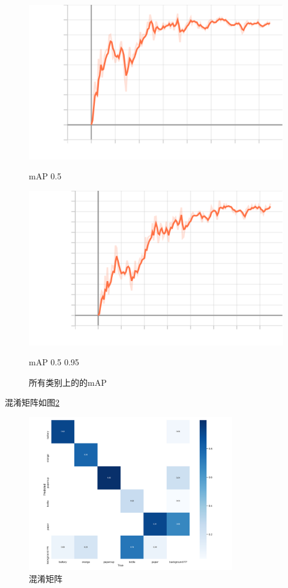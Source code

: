 \documentclass{article}
\begin{document}
\begin{figure}[H]
    \begin{minipage}[H]{0.5\linewidth}
        \centering
        \includegraphics[width=\textwidth]{figures/metrics_mAP_0.5.png}
        \caption{mAP 0.5}
    \end{minipage}
    \begin{minipage}[H]{0.5\linewidth}
        \centering
        \includegraphics[width=\textwidth]{figures/metrics_mAP_0.5 0.95.png}
        \caption{mAP 0.5 0.95}
    \end{minipage}
    \label{mAP}
    \caption{所有类别上的的mAP}
\end{figure}

混淆矩阵如图\ref{confusion_matrix}

\begin{figure}[H]
    \centering
    \includegraphics[width=0.8\textwidth]{figures/confusion_matrix.png}
    \caption{混淆矩阵}
    \label{confusion_matrix}
\end{figure}
\end{document}
